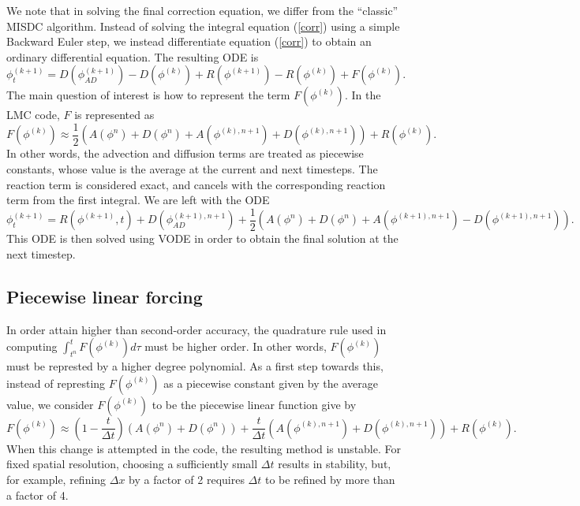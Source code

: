 \documentclass[12pt]{article}
\begin{document}
We note that in solving the final correction equation, we differ 
from the ``classic'' MISDC algorithm. Instead of solving the integral equation 
(\ref{corr}) using a simple Backward Euler step, we instead differentiate 
equation (\ref{corr}) to obtain an ordinary differential equation. The resulting 
ODE is
\begin{equation}
\phi^{(k+1)}_t = D(\phi_{AD}^{(k+1)}) - D(\phi^{(k)}) + R(\phi^{(k+1)})
                      - R(\phi^{(k)}) + F(\phi^{(k)}).
\end{equation}
The main question of interest is how to represent the term $F(\phi^{(k)})$. 
In the LMC code, $F$ is represented as
\begin{equation}
    F(\phi^{(k)}) \approx \frac{1}{2}\left(
        A(\phi^n) + D(\phi^n) + A(\phi^{(k),n+1})+D(\phi^{(k),n+1})
        \right) + R(\phi^{(k)}).
\end{equation}
In other words, the advection and diffusion terms are treated as piecewise 
constants, whose value is the average at the current and next timesteps. The 
reaction term is considered exact, and cancels with the corresponding reaction 
term from the first integral. We are left with the ODE
\begin{equation}
\phi^{(k+1)}_t = R(\phi^{(k+1)},t) + D(\phi_{AD}^{(k+1),n+1})
                 + \frac{1}{2}\left(A(\phi^n) + D(\phi^n) + 
                    A(\phi^{(k+1),n+1})-D(\phi^{(k+1),n+1})\right).
\end{equation}
This ODE is then solved using VODE in order to obtain the final solution at the 
next timestep.
\subsection{Piecewise linear forcing}\label{lmc-linear-forcing}
In order attain higher than second-order accuracy, the quadrature rule used in 
computing $\int_{t^n}^t F(\phi^{(k)})  d\tau$ must be higher order. In other 
words, $F(\phi^{(k)})$ must be represted by a higher degree polynomial. As a 
first step towards this, instead of represting $F(\phi^{(k)})$ as a piecewise 
constant given by the average value, we consider $F(\phi^{(k)})$ to be the 
piecewise linear function give by
\begin{equation}
    F(\phi^{(k)}) \approx \left(1-\frac{t}{\Delta t}\right)\left(
        A(\phi^n) + D(\phi^n)\right) + \frac{t}{\Delta t} \left(
        A(\phi^{(k),n+1})+D(\phi^{(k),n+1})
        \right) + R(\phi^{(k)}).
\end{equation}
When this change is attempted in the code, the resulting method is unstable. 
For fixed spatial resolution, choosing a sufficiently small $\Delta t$ results 
in stability, but, for example, refining $\Delta x$ by a factor of 2 requires 
$\Delta t$ to be refined by more than a factor of 4.
\end{document}
